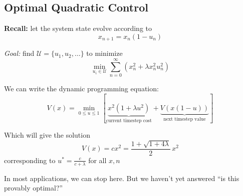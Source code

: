 \documentclass[12pt]{report}
\begin{document}
    \subsection*{Optimal Quadratic Control}
        \textbf{Recall:} let the system state evolve according to  
        \[x_{n+1} = x_n(1 - u_n)\]

        \emph{Goal:} find $\mathcal U = \{u_1, u_2, \dots\}$ to minimize 
        \[\min_{u_i \in \mathcal{U}} \sum_{n=0}^\infty (x_n^2 + \lambda x_n^2 u_n^2)\]

        We can write the dynamic programming equation:
        \[V(x) = \min_{0 \leq u \leq 1} \left[\underbrace{x^2(1 + \lambda u^2)}_{\text{current timestep cost}} + \underbrace{V(x(1 - u))}_{\text{next timestep value}}\right]\]

        Which will give the solution 
        \[V(x) = cx^2 = \frac{1 + \sqrt{1 + 4\lambda}}{2} \, x^2\]
        corresponding to $u^* = \frac{c}{c + \lambda}$ for all $x, n$

        In most applications, we can stop here. But we haven't yet answered ``is this provably optimal?''
\end{document}
